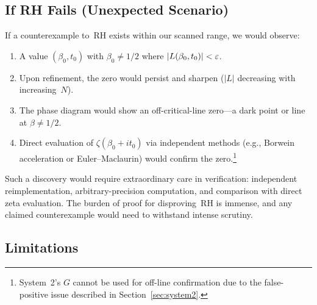\subsection{If RH Fails (Unexpected Scenario)}
\label{sec:rh-fails}

If a counterexample to~RH exists within our scanned range, we would observe:
\begin{enumerate}
  \item A value $(\beta_0, t_0)$ with $\beta_0 \neq 1/2$ where
        $|L(\beta_0, t_0)| < \varepsilon$.
  \item Upon refinement, the zero would persist and sharpen ($|L|$ decreasing with
        increasing~$N$).
  \item The phase diagram would show an off-critical-line zero---a dark point or line at
        $\beta \neq 1/2$.
  \item Direct evaluation of $\zeta(\beta_0 + it_0)$ via independent methods (e.g.,
        Borwein acceleration or Euler--Maclaurin) would confirm the
        zero.\footnote{System~2's $G$ cannot be used for off-line confirmation due to the
        false-positive issue described in Section~\ref{sec:system2}.}
\end{enumerate}

Such a discovery would require extraordinary care in verification: independent
reimplementation, arbitrary-precision computation, and comparison with direct zeta
evaluation. The burden of proof for disproving~RH is immense, and any claimed
counterexample would need to withstand intense scrutiny.


\subsection{Limitations}
\label{sec:limitations}


